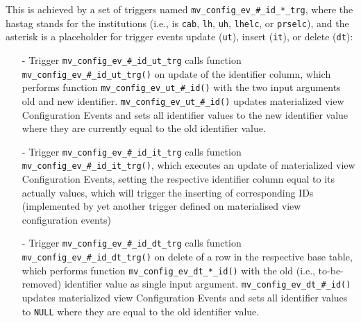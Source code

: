 This is achieved by a set of triggers named \texttt{mv\_config\_ev\_\#\_id\_*\_trg}, where the hastag stands for the institutions (i.e., is \texttt{cab}, \texttt{lh}, \texttt{uh}, \texttt{lhelc}, or \texttt{prselc}), and the asterisk is a placeholder for trigger events update (\texttt{ut}), insert (\texttt{it}), or delete (\texttt{dt}):
\begin{itemize}
\item[-]Trigger \texttt{mv\_config\_ev\_\#\_id\_ut\_trg} calls function \texttt{mv\_config\_ev\_\#\_id\_ut\_trg()} on update of the identifier column, which performs function \texttt{mv\_config\_ev\_ut\_\#\_id()} with the two input arguments old and new identifier.
\texttt{mv\_config\_ev\_ut\_\#\_id()} updates materialized view Configuration Events and sets all identifier values to the new identifier value where they are currently equal to the old identifier value.

\item[-]Trigger \texttt{mv\_config\_ev\_\#\_id\_it\_trg} calls function \texttt{mv\_config\_ev\_\#\_id\_it\_trg()}, which executes an update of materialized view Configuration Events, setting the respective identifier column equal to its actually values, which will trigger the inserting of corresponding IDs (implemented by yet another trigger defined on materialised view configuration events)

\item[-]Trigger \texttt{mv\_config\_ev\_\#\_id\_dt\_trg} calls function \texttt{mv\_config\_ev\_\#\_id\_dt\_trg()} on delete of a row in the respective base table, which performs function \texttt{mv\_config\_ev\_dt\_*\_id()} with the old (i.e., to-be-removed) identifier value as single input argument.
\texttt{mv\_config\_ev\_dt\_\#\_id()} updates materialized view Configuration Events and sets all identifier values to \texttt{NULL} where they are equal to the old identifier value.
\end{itemize}

